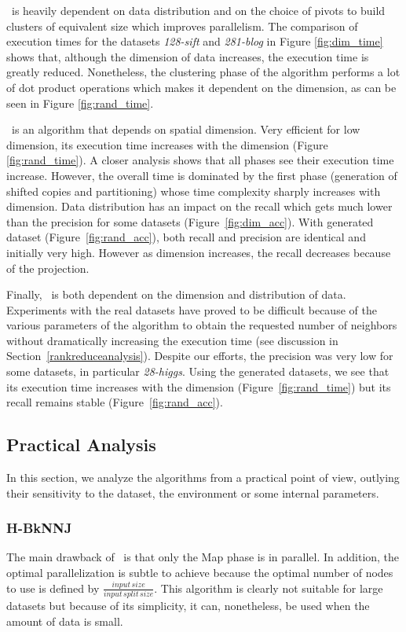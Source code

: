 \VO~is heavily dependent on data distribution and on the choice of pivots to build clusters of 
equivalent size which improves parallelism. The comparison of execution times for the datasets 
\emph{128-sift} and \emph{281-blog} in Figure \ref{fig:dim_time} shows that, although the dimension
of data increases, the execution time is greatly reduced. Nonetheless, the clustering phase of the algorithm performs a 
lot of dot product operations which makes it dependent on the dimension, as can be seen in Figure \ref{fig:rand_time}. 

\Z~is an algorithm that depends on spatial dimension. Very efficient for low dimension, its 
execution time increases with the dimension (Figure \ref{fig:rand_time}). A closer 
analysis shows that all phases see their execution time increase. However, the overall time is 
dominated by the first phase (generation of shifted copies and partitioning) whose time complexity
sharply increases with dimension. Data distribution has 
an impact on the recall which gets much lower than the precision for some datasets (Figure~\ref{fig:dim_acc}).
With generated dataset (Figure~\ref{fig:rand_acc}), both recall and precision are identical and initially very high. 
However as dimension increases, the recall decreases because of the projection. 

Finally, \LSH~is both dependent on the dimension and distribution of data. Experiments with the real datasets have 
proved to be difficult because of the various parameters of the algorithm to obtain the requested number of 
neighbors without dramatically increasing the execution time (see discussion in Section~\ref{rankreduceanalysis}). 
Despite our efforts, the precision was very low for some datasets, in particular \emph{28-higgs}. 
Using the generated datasets, we see that its execution time increases with the dimension (Figure~\ref{fig:rand_time}) 
but its recall remains stable (Figure~\ref{fig:rand_acc}). 

\subsection{Practical Analysis}
In this section, we analyze the algorithms from a practical point of view, outlying their sensitivity to 
the dataset, the environment or some internal parameters.   
\subsubsection{H-BkNNJ}
The main drawback of \HBK~is that only the Map phase is in parallel. In addition, the optimal parallelization 
is subtle to achieve because the optimal number of nodes to use is defined by  
$\frac{input\,size}{input\,split\,size}$. This algorithm is clearly not suitable for large datasets but because of its 
simplicity, it can, nonetheless, be used when the amount of data is small.  

